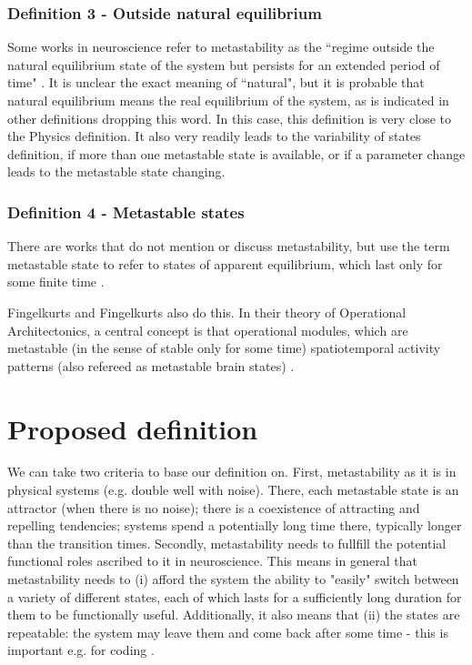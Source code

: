 \documentclass[preprint,superscriptaddress,showpacs,amsmath,amssymb,aps,pre,floatfix]{revtex4-1}
\theoremstyle{definition}
\begin{document}
\subsubsection{Definition 3 - Outside natural equilibrium }
Some works in neuroscience refer to metastability as the ``regime outside the natural equilibrium state of the system but persists for an extended period of time" \cite{deco_2017, deco_2015, naik_2017, kringelbach_2015}. It is unclear the exact meaning of ``natural", but it is probable that natural equilibrium means the real equilibrium of the system, as is indicated in other definitions \cite{alderson_2020} dropping this word.
In this case, this definition is very close to the Physics definition. It also very readily leads to the variability of states definition, if more than one metastable state is available, or if a parameter change leads to the metastable state changing.


\subsubsection{Definition 4 - Metastable states}
\label{sec:defmetstates}
There are works that do not mention or discuss metastability, but use the term metastable state to refer to states of apparent equilibrium, which last only for some finite time \cite{rabinovich_2008}.

Fingelkurts and Fingelkurts also do this. In their theory of Operational Architectonics, a central concept is that operational modules, which are metastable (in the sense of stable only for some time) spatiotemporal activity patterns (also refereed as metastable brain states) \cite{fingelkurts_2008}. 


\section{Proposed definition}
\label{sec:ourdef}

We can take two criteria to base our definition on. First, metastability as it is in physical systems (e.g. double well with noise). There, each metastable state is an attractor (when there is no noise); there is a coexistence of attracting and repelling tendencies; systems spend a potentially long time there, typically longer than the transition times. Secondly, metastability needs to fullfill the potential functional roles ascribed to it in neuroscience. This means in general that metastability needs to (i) afford the system the ability to "easily" switch between a variety of different states, each of which lasts for a sufficiently long duration for them to be functionally useful. Additionally, it also means that (ii) the states are repeatable: the system may leave them and come back after some time - this is important e.g. for coding \cite{brinkman2022}.
\end{document}
